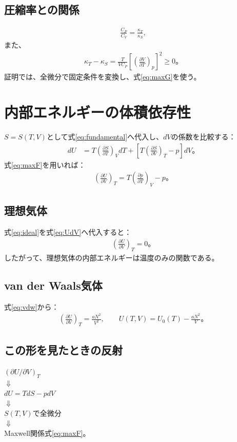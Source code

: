 \documentclass[platex,dvipdfmx,a4paper,10pt]{jsarticle}
\newcommand{\flow}[1]{\begin{center}\begin{minipage}{0.94\textwidth}\centering #1\end{minipage}\end{center}}
\begin{document}
\subsection{圧縮率との関係}
\begin{align}
  \frac{C_P}{C_V}=\frac{\kappa_T}{\kappa_S},\label{eq:ratio-compressibility}
\end{align}
また、
\begin{align}
  \kappa_T-\kappa_S
  =\frac{T}{VC_P}\left[\left(\frac{\partial V}{\partial T}\right)_p\right]^2\ge0。\label{eq:kdiff}
\end{align}
証明では、全微分で固定条件を変換し、式\eqref{eq:maxG}を使う。

\newpage
\section{内部エネルギーの体積依存性}\label{sec:Uvolume}
$S=S(T,V)$として式\eqref{eq:fundamental}へ代入し、$dV$の係数を比較する：
\begin{align*}
  dU&=T\left(\frac{\partial S}{\partial T}\right)_VdT
  +\left[T\left(\frac{\partial S}{\partial V}\right)_T-p\right]dV。
\end{align*}
式\eqref{eq:maxF}を用いれば：
\begin{align}
  \left(\frac{\partial U}{\partial V}\right)_T
  =T\left(\frac{\partial p}{\partial T}\right)_V-p。\label{eq:UdV}
\end{align}

\subsection{理想気体}
式\eqref{eq:ideal}を式\eqref{eq:UdV}へ代入すると：
\begin{align*}
  \left(\frac{\partial U}{\partial V}\right)_T=0。
\end{align*}
したがって、理想気体の内部エネルギーは温度のみの関数である。

\subsection{van der Waals気体}
式\eqref{eq:vdw}から：
\begin{align}
  \left(\frac{\partial U}{\partial V}\right)_T=\frac{aN^2}{V^2},\qquad
  U(T,V)=U_0(T)-\frac{aN^2}{V}。\label{eq:Uvdw}
\end{align}

\subsection{この形を見たときの反射}
\flow{$(\partial U/\partial V)_T$\\$\Downarrow$\\$dU=TdS-pdV$\\$\Downarrow$\\$S(T,V)$で全微分\\$\Downarrow$\\Maxwell関係式\eqref{eq:maxF}。}
\end{document}

